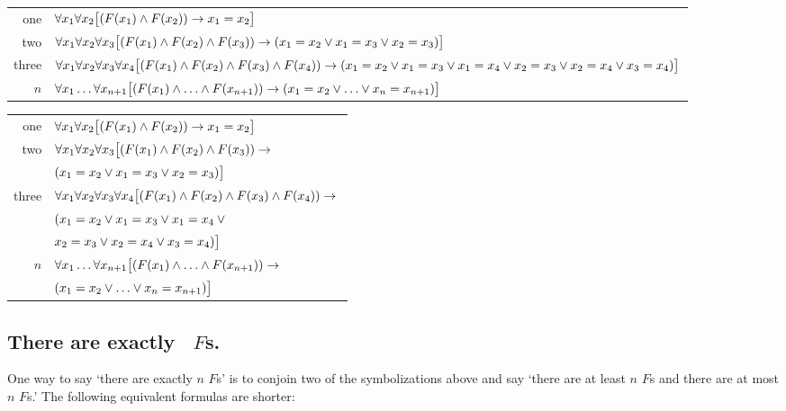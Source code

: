 \noindent
\ifHTMLtarget
\begin{tabular*}{\textwidth}{rl}
	one & $\forall x_1\forall x_2\bigl[(\mathord{F}(x_1) \wedge
	\mathord{F}(x_2)) \rightarrow x_1=x_2\bigr]$\\
	two & $\forall x_1\forall x_2\forall x_3\bigl[(\mathord{F}(x_1) \wedge \mathord{F}(x_2) \wedge \mathord{F}(x_3)) \rightarrow (x_1=x_2 \vee x_1=x_3 \vee x_2=x_3)\bigr]$\\
	three & $\forall x_1\forall x_2\forall x_3\forall x_4\bigl[(\mathord{F}(x_1) \wedge \mathord{F}(x_2) \wedge \mathord{F}(x_3) \wedge \mathord{F}(x_4)) \rightarrow (x_1=x_2 \vee x_1=x_3 \vee x_1=x_4 \vee x_2=x_3 \vee x_2=x_4 \vee x_3=x_4)\bigr]$\\
	$n$ & $\forall x_1\ldots\forall x_{n+1} \bigl[(\mathord{F}(x_1) \wedge \ldots \wedge \mathord{F}(x_{n+1})) \rightarrow (x_1=x_2 \vee \ldots \vee x_n=x_{n+1})\bigr]$ 
\end{tabular*}
\else
\begin{tabular*}{\textwidth}{rl}
	one & $\forall x_1\forall x_2\bigl[(\mathord{F}(x_1) \wedge
	\mathord{F}(x_2)) \rightarrow x_1=x_2\bigr]$\\
	two & $\forall x_1\forall x_2\forall x_3\bigl[(\mathord{F}(x_1) \wedge \mathord{F}(x_2) \wedge \mathord{F}(x_3)) \rightarrow {}$\\ & \quad$(x_1=x_2 \vee x_1=x_3 \vee x_2=x_3)\bigr]$\\
	three & $\forall x_1\forall x_2\forall x_3\forall x_4\bigl[(\mathord{F}(x_1) \wedge \mathord{F}(x_2) \wedge \mathord{F}(x_3) \wedge \mathord{F}(x_4)) \rightarrow {}$\\
	& \quad$(x_1=x_2 \vee x_1=x_3 \vee x_1=x_4 \vee {}$\\
	& \qquad$x_2=x_3 \vee x_2=x_4 \vee x_3=x_4)\bigr]$\\
	$n$ & $\forall x_1\ldots\forall x_{n+1}
	\bigl[(\mathord{F}(x_1) \wedge \ldots \wedge \mathord{F}(x_{n+1})) \rightarrow {}$\\
	& \quad$(x_1=x_2 \vee \ldots \vee x_n=x_{n+1})\bigr]$ 
\end{tabular*}
\fi


\subsection*{There are exactly \blank\ $F$s.}
\label{summary.exactly}

One way to say `there are exactly $n$ $F$s' is to conjoin two of the symbolizations above and say `there are at least $n$ $F$s and there are at most $n$ $F$s.' The following equivalent formulas are shorter:

